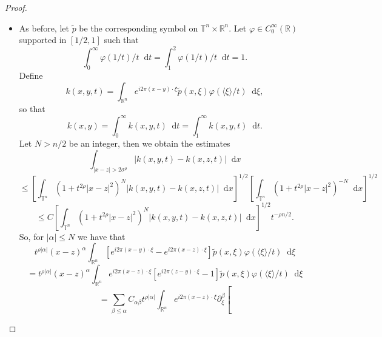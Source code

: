 \documentclass[12pt, reqno]{amsart}
\theoremstyle{definition}
\theoremstyle{remark}
\numberwithin{equation}{section}
\newcommand*\diff{\mathop{}\!\mathrm{d}}
\begin{document}
\begin{proof}
\begin{itemize}
        \item[(b)] As before, let $\tilde{p}$ be the corresponding symbol on $\mathbb{T}^n \times \mathbb{R}^n$.  Let $\varphi \in C_0^\infty(\mathbb{R})$ supported in $[1/2, 1]$ such that 
        \begin{equation*}
            \int_0^\infty\varphi(1/t)/t \diff t =\int_1^2\varphi(1/t)/t \diff t = 1.
        \end{equation*} 
        Define 
        \begin{equation*}
            k(x, y, t) = \int_{\mathbb{R}^n} e^{i2\pi(x - y) \cdot \xi} \tilde{p}(x, \xi) \varphi(\langle\xi\rangle/t) \diff \xi,
        \end{equation*}
        so that  
        \begin{equation*}
            k(x, y) = \int_0^\infty k(x, y, t) \diff t = \int_1^\infty k(x, y, t) \diff t.
        \end{equation*}
        Let $N > n/2$ be an integer, then we obtain the estimates
        \begin{equation*}
            \int_{|x-z|>2\sigma^\rho} |k(x, y, t) - k(x, z, t)| \diff x
        \end{equation*}
        \begin{equation*}
            \leq  \left[ \int_{\mathbb{T}^n} (1+t^{2\rho}|x-z|^2)^N |k(x, y, t) - k(x, z, t)| \diff x  \right]^{1/2} \left[ \int_{\mathbb{T}^n} (1+t^{2\rho}|x-z|^2)^{-N} \diff x \right]^{1/2} 
        \end{equation*}
        \begin{equation}
            \leq C\left[ \int_{\mathbb{T}^n} (1+t^{2\rho}|x-z|^2)^N |k(x, y, t) - k(x, z, t)| \diff x  \right]^{1/2}t^{-\rho n/2}.
            \label{eq:firstbound-b}
        \end{equation}
        So, for $|\alpha| \leq N$ we have that
        \begin{equation*}
            t^{\rho|\alpha|}(x-z)^\alpha \int_{\mathbb{R}^n} \left[ e^{i2\pi(x - y) \cdot \xi} - e^{i2\pi(x - z) \cdot \xi} \right]\tilde{p}(x, \xi)\varphi(\langle\xi\rangle/t)\diff \xi 
        \end{equation*}
        \begin{equation*}
            =t^{\rho|\alpha|}(x-z)^\alpha \int_{\mathbb{R}^n} e^{i2\pi(x - z) \cdot \xi} \left[ e^{i2\pi(z - y) \cdot \xi} - 1 \right]\tilde{p}(x, \xi)\varphi(\langle\xi\rangle/t)\diff \xi 
        \end{equation*}
        \begin{equation*}
            =\sum_{\beta\leq\alpha} C_{\alpha\beta} t^{\rho|\alpha|} \int_{\mathbb{R}^n} e^{i2\pi(x - z) \cdot \xi} \partial^\beta_\xi \left[ 

\end{equation*}
\end{itemize}
\end{proof}
\end{document}

